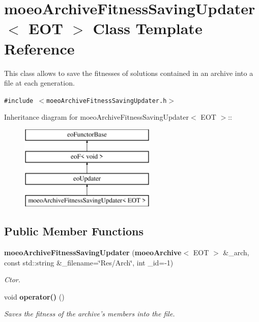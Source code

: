 \section{moeo\-Archive\-Fitness\-Saving\-Updater$<$ EOT $>$ Class Template Reference}
\label{classmoeoArchiveFitnessSavingUpdater}
This class allows to save the fitnesses of solutions contained in an archive into a file at each generation.  


{\tt \#include $<$moeo\-Archive\-Fitness\-Saving\-Updater.h$>$}

Inheritance diagram for moeo\-Archive\-Fitness\-Saving\-Updater$<$ EOT $>$::\begin{figure}[H]
\begin{center}
\leavevmode
\includegraphics[height=4cm]{classmoeoArchiveFitnessSavingUpdater}
\end{center}
\end{figure}
\subsection*{Public Member Functions}
\begin{CompactItemize}
\item 
{\bf moeo\-Archive\-Fitness\-Saving\-Updater} ({\bf moeo\-Archive}$<$ EOT $>$ \&\_\-arch, const std::string \&\_\-filename=\char`\"{}Res/Arch\char`\"{}, int \_\-id=-1)
\begin{CompactList}\small\item\em Ctor. \item\end{CompactList}\item 
void {\bf operator()} ()\label{classmoeoArchiveFitnessSavingUpdater_2ad5d3ab2c2066a1a3b85fff2ac14a19}

\begin{CompactList}\small\item\em Saves the fitness of the archive's members into the file. \item\end{CompactList}\end{CompactItemize}

